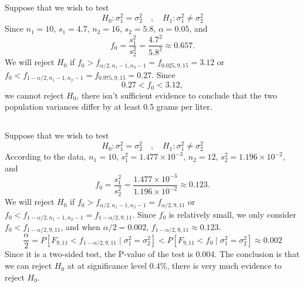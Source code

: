 \documentclass[11pt,a4paper]{article}
\begin{document}
\subsection{}

Suppose that we wish to test
$$H_0:\sigma_1^2=\sigma_2^2\quad,\quad H_1:\sigma_1^2\neq\sigma_2^2$$
Since $n_1=10$, $s_1=4.7$, $n_2=16$, $s_2=5.8$, $\alpha=0.05$, and
$$f_0=\frac{s_1^2}{s_2^2}=\frac{4.7^2}{5.8^2}\approx0.657.$$
We will reject $H_0$ if $f_0>f_{\alpha/2,n_1-1,n_2-1}=f_{0.025,9,15}=3.12$ or $f_0<f_{1-\alpha/2,n_1-1,n_2-1}=f_{0.975,9,15}=0.27$. Since 
$$0.27<f_0<3.12,$$
we cannot reject $H_0$, there isn't sufficient evidence to conclude that the two population variances differ by at least 0.5 grams per liter.

\subsection{}
Suppose that we wish to test
$$H_0:\sigma_1^2=\sigma_2^2\quad,\quad H_1:\sigma_1^2\neq\sigma_2^2$$
According to the data, $n_1=10$, $s_1^2=1.477\times10^{-3}$, $n_2=12$, $s_2^2=1.196\times10^{-2}$, and 
$$f_0=\frac{s_1^2}{s_2^2}=\frac{1.477\times10^{-3}}{1.196\times10^{-2}}\approx0.123.$$
We will reject $H_0$ if $f_0>f_{\alpha/2,n_1-1,n_2-1}=f_{\alpha/2,9,11}$ or $f_0<f_{1-\alpha/2,n_1-1,n_2-1}=f_{1-\alpha/2,9,11}$. Since $f_0$ is relatively small, we only consider $f_0<f_{1-\alpha/2,9,11}$, and when $\alpha/2=0.002$, $f_{1-\alpha/2,9,11}\approx 0.123$.
$$\frac{\alpha}{2}=P[F_{9,11}<f_{1-\alpha/2,9,11}\mid \sigma_1^2=\sigma_2^2]< P[F_{9,11}<f_0\mid \sigma_1^2=\sigma_2^2]\approx0.002$$
Since it is a two-sided test, the P-value of the test is 0.004. The conclusion is that we can reject $H_0$ at at significance level 0.4\%, there is very much evidence to reject $H_0$.
\end{document}
